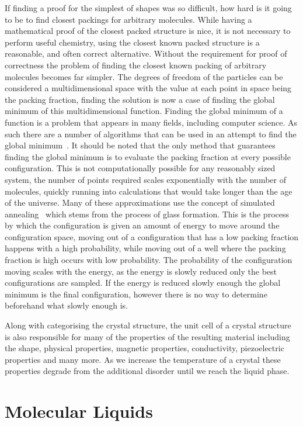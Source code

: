 If finding a proof for the simplest of shapes was so difficult, how hard is it going to be to find closest packings for arbitrary molecules. While having a mathematical proof of the closest packed structure is nice, it is not necessary to perform useful chemistry, using the closest known packed structure is a reasonable, and often correct alternative. Without the requirement for proof of correctness the problem of finding the closest known packing of arbitrary molecules becomes far simpler. The degrees of freedom of the particles can be considered a multidimensional space with the value at each point in space being the packing fraction, finding the solution is now a case of finding the global minimum of this multidimensional function. Finding the global minimum of a function is a problem that appears in many fields, including computer science. As such there are a number of algorithms that can be used in an attempt to find the global minimum~\cite{press:07}. It should be noted that the only method that guarantees finding the global minimum is to evaluate the packing fraction at every possible configuration. This is not computationally possible for any reasonably sized system, the number of points required scales exponentially with the number of molecules, quickly running into calculations that would take longer than the age of the universe. Many of these approximations use the concept of simulated annealing~\cite{kirkpatrick:83} which stems from the process of glass formation. This is the process by which the configuration is given an amount of energy to move around the configuration space, moving out of a configuration that has a low packing fraction happens with a high probability, while moving out of a well where the packing fraction is high occurs with low probability. The probability of the configuration moving scales with the energy, as the energy is slowly reduced only the best configurations are sampled. If the energy is reduced slowly enough the global minimum is the final configuration, however there is no way to determine beforehand what slowly enough is.

Along with categorising the crystal structure, the unit cell of a crystal structure is also responsible for many of the properties of the resulting material including the shape, physical properties, magnetic properties, conductivity, piezoelectric properties and many more. As we increase the temperature of a crystal these properties degrade from the additional disorder until we reach the liquid phase.

\section{Molecular Liquids}

